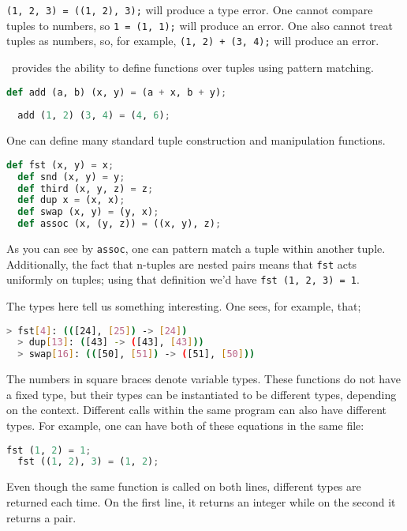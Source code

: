 \lstinline{(1, 2, 3) = ((1, 2), 3);} will produce a type error. One cannot compare tuples to numbers, so \lstinline{1 = (1, 1);} will produce an error. One also cannot treat tuples as numbers, so, for example, \lstinline{(1, 2) + (3, 4);} will produce an error.

\vampir\ provides the ability to define functions over tuples using pattern matching.

\begin{lstlisting}[language=Python]
  def add (a, b) (x, y) = (a + x, b + y);
  
  add (1, 2) (3, 4) = (4, 6);
\end{lstlisting}

One can define many standard tuple construction and manipulation functions.

\begin{lstlisting}[language=Python]
  def fst (x, y) = x;
  def snd (x, y) = y;
  def third (x, y, z) = z;
  def dup x = (x, x);
  def swap (x, y) = (y, x);
  def assoc (x, (y, z)) = ((x, y), z);
\end{lstlisting}

As you can see by \lstinline{assoc}, one can pattern match a tuple within another tuple. Additionally, the fact that n-tuples are nested pairs means that \lstinline{fst} acts uniformly on tuples; using that definition we'd have \lstinline{fst (1, 2, 3) = 1}.

The types here tell us something interesting. One sees, for example, that;

\begin{lstlisting}[language=bash]
  > fst[4]: (([24], [25]) -> [24])
  > dup[13]: ([43] -> ([43], [43]))
  > swap[16]: (([50], [51]) -> ([51], [50]))
\end{lstlisting}

The numbers in square braces denote variable types. These functions do not have a fixed type, but their types can be instantiated to be different types, depending on the context. Different calls within the same program can also have different types. For example, one can have both of these equations in the same file:

\begin{lstlisting}[language=Python]
  fst (1, 2) = 1;
  fst ((1, 2), 3) = (1, 2);
\end{lstlisting}

Even though the same function is called on both lines, different types are returned each time. On the first line, it returns an integer while on the second it returns a pair.

